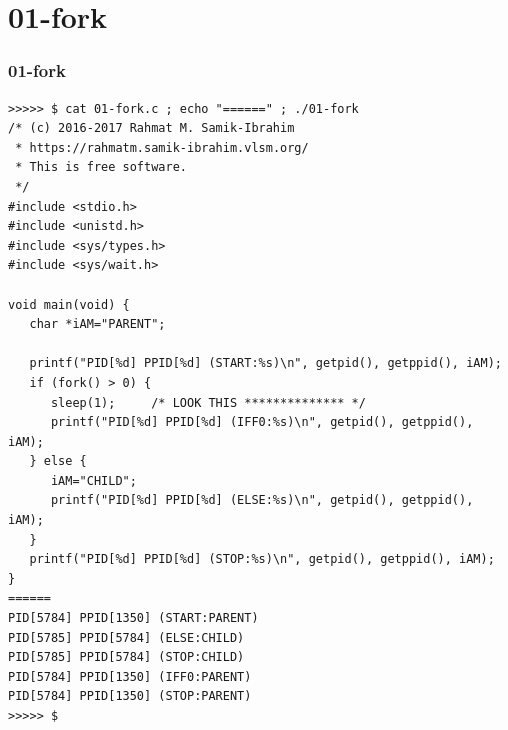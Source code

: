 \documentclass[aspectratio=169, xcolor=table, notheorems, hyperref={pdfpagelabels=false}]{beamer}
\begin{document}
\section{01-fork}
\begin{frame}[fragile]
\frametitle{01-fork}
\begin{lstlisting}[basicstyle=\ttfamily\tiny]
>>>>> $ cat 01-fork.c ; echo "======" ; ./01-fork 
/* (c) 2016-2017 Rahmat M. Samik-Ibrahim
 * https://rahmatm.samik-ibrahim.vlsm.org/
 * This is free software.
 */
#include <stdio.h>
#include <unistd.h>
#include <sys/types.h>
#include <sys/wait.h>

void main(void) {
   char *iAM="PARENT";
  
   printf("PID[%d] PPID[%d] (START:%s)\n", getpid(), getppid(), iAM);
   if (fork() > 0) {
      sleep(1);     /* LOOK THIS ************** */
      printf("PID[%d] PPID[%d] (IFF0:%s)\n", getpid(), getppid(), iAM);
   } else {
      iAM="CHILD";
      printf("PID[%d] PPID[%d] (ELSE:%s)\n", getpid(), getppid(), iAM);
   }
   printf("PID[%d] PPID[%d] (STOP:%s)\n", getpid(), getppid(), iAM);
}
======
PID[5784] PPID[1350] (START:PARENT)
PID[5785] PPID[5784] (ELSE:CHILD)
PID[5785] PPID[5784] (STOP:CHILD)
PID[5784] PPID[1350] (IFF0:PARENT)
PID[5784] PPID[1350] (STOP:PARENT)
>>>>> $ 

\end{lstlisting}
\end{frame}

\end{document}
